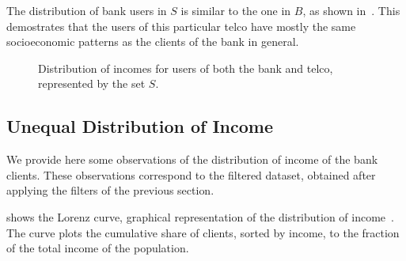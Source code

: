 The distribution of bank users in $S$ is similar to the one in $B$, as shown in~. This demostrates that the users of this particular telco have mostly the same socioeconomic patterns as the clients of the bank in general.

\begin{figure}
\centering
{}
\caption{Distribution of incomes for users of both the bank and telco, represented by the set $S$.}
\label{fig:matchdistribution}
\end{figure}


% 
% 

\subsection{Unequal Distribution of Income}

We provide here some observations of the distribution of income of the bank clients. These observations correspond to the filtered dataset, obtained after applying the filters of the previous section.

 shows the Lorenz curve, graphical representation of the distribution of income~\cite{satchell1987}. The curve plots the cumulative share of clients, sorted by income, to the fraction of the total income of the population.

